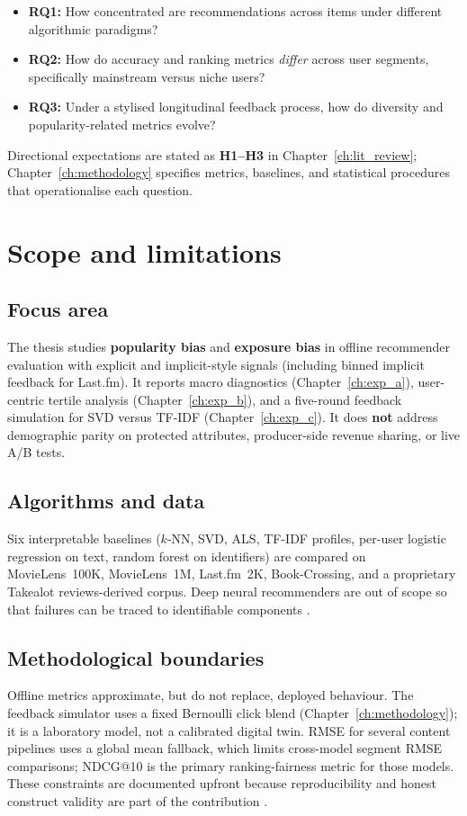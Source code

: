 \begin{itemize}
  \item \textbf{RQ1:} How concentrated are recommendations across items under different algorithmic paradigms?
  \item \textbf{RQ2:} How do accuracy and ranking metrics \emph{differ} across user segments, specifically mainstream versus niche users?
  \item \textbf{RQ3:} Under a stylised longitudinal feedback process, how do diversity and popularity-related metrics evolve?
\end{itemize}

\noindent Directional expectations are stated as \textbf{H1--H3} in Chapter~\ref{ch:lit_review}; Chapter~\ref{ch:methodology} specifies metrics, baselines, and statistical procedures that operationalise each question.

\section{Scope and limitations}
\subsection{Focus area}
The thesis studies \textbf{popularity bias} and \textbf{exposure bias} in offline recommender evaluation with explicit and implicit-style signals (including binned implicit feedback for Last.fm). It reports macro diagnostics (Chapter~\ref{ch:exp_a}), user-centric tertile analysis (Chapter~\ref{ch:exp_b}), and a five-round feedback simulation for SVD versus TF-IDF (Chapter~\ref{ch:exp_c}). It does \textbf{not} address demographic parity on protected attributes, producer-side revenue sharing, or live A/B tests.

\subsection{Algorithms and data}
Six interpretable baselines ($k$-NN, SVD, ALS, TF-IDF profiles, per-user logistic regression on text, random forest on identifiers) are compared on MovieLens~100K, MovieLens~1M, Last.fm~2K, Book-Crossing, and a proprietary Takealot reviews-derived corpus. Deep neural recommenders are out of scope so that failures can be traced to identifiable components \citep{ferrari2019progress, he2020lightgcn}.

\subsection{Methodological boundaries}
Offline metrics approximate, but do not replace, deployed behaviour. The feedback simulator uses a fixed Bernoulli click blend (Chapter~\ref{ch:methodology}); it is a laboratory model, not a calibrated digital twin. RMSE for several content pipelines uses a global mean fallback, which limits cross-model segment RMSE comparisons; NDCG@10 is the primary ranking-fairness metric for those models. These constraints are documented upfront because reproducibility and honest construct validity are part of the contribution \citep{ferrari2019progress}.

